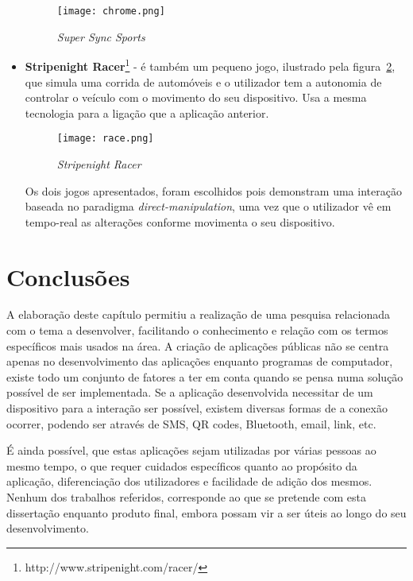 \begin{itemize}
\begin{figure}[ht]
\centering
\texttt{[image: chrome.png]}
\caption {\textit{Super Sync Sports}}
\label{fig:chrome}
\end{figure}

\item \textbf{Stripenight Racer}\footnote{http://www.stripenight.com/racer/} - é também um pequeno jogo, ilustrado pela figura~\ref{fig:racer}, que simula uma corrida de automóveis e o utilizador tem a autonomia de controlar o veículo com o movimento do seu dispositivo. Usa a mesma tecnologia para a ligação que a aplicação anterior.

\begin{figure}[ht]
\centering
\texttt{[image: race.png]}
\caption {\textit{Stripenight Racer}}
\label{fig:racer}
\end{figure}

Os dois jogos apresentados, foram escolhidos pois demonstram uma interação baseada no paradigma \textit{direct-manipulation}, uma vez que o utilizador vê em tempo-real as alterações conforme movimenta o seu dispositivo.


\end{itemize}

\section{Conclusões}

A elaboração deste capítulo permitiu a realização de uma pesquisa relacionada com o tema a desenvolver, facilitando o conhecimento e relação com os termos específicos mais usados na área.
A criação de aplicações públicas não se centra apenas no desenvolvimento das aplicações enquanto programas de computador, existe todo um conjunto de fatores a ter em conta quando se pensa numa solução possível de ser implementada.
Se a aplicação desenvolvida necessitar de um dispositivo para a interação ser possível, existem diversas formas de a conexão ocorrer, podendo ser através de SMS, QR codes, Bluetooth, email, link, etc.

É ainda possível, que estas aplicações sejam utilizadas por várias pessoas ao mesmo tempo, o que requer cuidados específicos quanto ao propósito da aplicação, diferenciação dos utilizadores e facilidade de adição dos mesmos.
Nenhum dos trabalhos referidos, corresponde ao que se pretende com esta dissertação enquanto produto final, embora possam vir a ser úteis ao longo do seu desenvolvimento.


	
